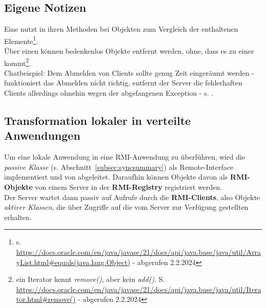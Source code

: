 \subsection*{Eigene Notizen}

\noindent
Eine  nutzt in ihren Methoden bei Objekten  zum Vergleich der enthaltenen Elemente\footnote{
    s. \url{https://docs.oracle.com/en/java/javase/21/docs/api/java.base/java/util/ArrayList.html#equals(java.lang.Object)} - abgerufen 2.2.2024
}.\\

\noindent
Über einen  können bedenkenlos Objekte entfernt werden, ohne, dass es zu einer  kommt\footnote{ein Iterator kennt \textit{remove()}, aber kein \textit{add()}. S. \url{https://docs.oracle.com/en/java/javase/21/docs/api/java.base/java/util/Iterator.html#remove()} - abgerufen 2.2.2024}.\\


\noindent
Chatbeispiel: Dem Abmelden von Clients sollte genug Zeit eingeräumt werden - funktioniert das Abmelden nicht richtig, entfernt der Server die fehlerhaften Clients allerdings ohnehin wegen der abgefangenen Exception - s. \cite[345, Listing 6.22]{Oec22}.


\subsection{Transformation lokaler in verteilte Anwendungen}

Um eine lokale Anwendung in eine RMI-Anwendung zu überführen, wird die \textit{passive Klasse} (s. Abschnitt~\ref{subsec:syncsummary}) als Remote-Interface implementiert und von  abgeleitet.
Daraufhin können Objekte davon als \textbf{RMI-Objekte} von einem Server in der \textbf{RMI-Registry} registriert werden.\\

\noindent
Der Server wartet dann passiv auf Aufrufe durch die \textbf{RMI-Clients}, also Objekte \textit{aktiver Klassen}, die über  Zugriffe auf die vom Server zur Verfügung gestellten  erhalten.\\

